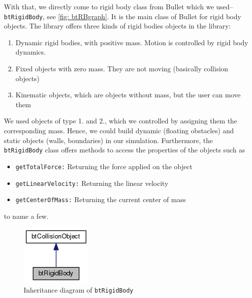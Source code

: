 With that, we directly come to rigid body class from Bullet which we used-- \verb+btRigidBody+, see \autoref{fig: btRBgraph}. It is the main class of Bullet for rigid body objects. The library offers three kinds of rigid bodies objects in the library:
\begin{enumerate}
\item Dynamic rigid bodies, with positive mass. Motion is controlled by rigid body dynamics.
\item Fixed objects with zero mass. They are not moving (basically collision objects)
\item Kinematic objects, which are objects without mass, but the user can move them
\end{enumerate}
We used objects of type 1. and 2., which we controlled by assigning them the corresponding mass. Hence, we could build dynamic (floating obstacles) and static objects (walls, boundaries) in our simulation. Furthermore, the \texttt{btRigidBody} class offers methods to access the properties of the objects such as 
\begin{itemize}
\item \texttt{getTotalForce:} Returning the force applied on the object
\item \texttt{getLinearVelocity:} Returning the linear velocity
\item \texttt{getCenterOfMass:} Returning the current center of mass
\end{itemize}
to name a few. 
\begin{figure}
\centering
\includegraphics[scale=0.5]{img/RigidBodies/btRigidBodyGraph.png}
\caption{Inheritance diagram of \texttt{btRigidBody}}
\label{fig: btRBgraph}
\end{figure}


